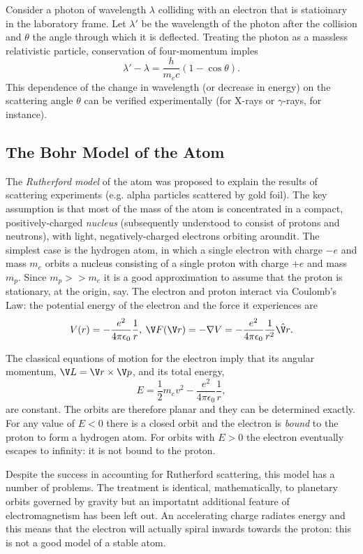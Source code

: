 \documentclass[a4paper]{article}
\begin{document}
Consider a photon of wavelength $\lambda$ colliding with an electron that is statioinary in the laboratory frame. Let $\lambda'$ be the wavelength of the photon after the collision and $\theta$ the angle through which it is deflected. Treating the photon as a massless relativistic particle, conservation of four-momentum imples
\[
  \lambda'-\lambda = \frac{h}{m_e c}(1-\cos \theta).
\]
This dependence of the change in wavelength (or decrease in energy) on the scattering angle $\theta$ can be verified experimentally (for X-rays or $\gamma$-rays, for instance).

\subsection{The Bohr Model of the Atom}

The \emph{Rutherford model} of the atom was proposed to explain the results of scattering experiments (e.g. alpha particles scattered by gold foil). The key assumption is that most of the mass of the atom is concentrated in a compact, positively-charged \emph{nucleus} (subsequently understood to consist of protons and neutrons), with light, negatively-charged electrons orbiting aroundit. The simplest case is the hydrogen atom, in which a single electron with charge $-e$ and mass $m_e$ orbits a nucleus consisting of a single proton with charge $+e$ and mass $m_p$. Since $m_p >> m_e$ it is a good approximation to assume that the proton is stationary, at the origin, say. The electron and proton interact via Coulomb's Law: the potential energy of the electron and the force it experiences are
\[
  V(r) = -\frac{e^2}{4\pi \epsilon_0} \frac{1}{r},\: \V F(\V r) = -\nabla V = -\frac{e^2}{4\pi \epsilon_0}\frac{1}{r^2} \hat{\V r}.
\]

The classical equations of motion for the electron imply that its angular momentum, $\V L = \V r \times \V p$, and its total energy,
\[
  E=\frac{1}{2}m_e v^2 - \frac{e^2}{4\pi\epsilon_0}\frac{1}{r},
\]
are constant. The orbits are therefore planar and they can be determined exactly. For any value of $E<0$ there is a closed orbit and the electron is \emph{bound} to the proton to form a hydrogen atom. For orbits with $E>0$ the electron eventually escapes to infinity: it is not bound to the proton.

Despite the success in accounting for Rutherford scattering, this model has a number of problems. The treatment is identical, mathematically, to planetary orbits governed by gravity but an importatnt additional feature of electromagnetism has been left out. An accelerating charge radiates energy and this means that the electron will actually spiral inwards towards the proton: this is not a good model of a stable atom.
\end{document}
